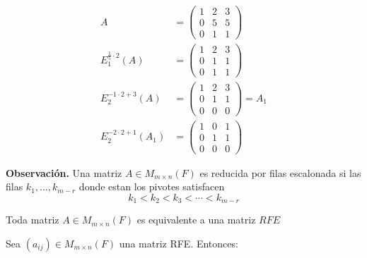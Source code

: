 \documentclass[12pt,a4paper]{book}
\begin{document}
    \begin{ejemplo}
        \begin{align*}
            A&=
            \begin{pmatrix}
                1 & 2 & 3\\
                0 & 5 & 5\\
                0 & 1 & 1
            \end{pmatrix}
            \\
            E_{1}^{\frac{1}{5}\cdot2}(A)&=
            \begin{pmatrix}
                1 & 2 & 3\\
                0 & 1 & 1\\
                0 & 1 & 1
            \end{pmatrix}
            \\
            E_{2}^{-1\cdot2+3}(A)&=
            \begin{pmatrix}
                1 & 2 & 3\\
                0 & 1 & 1\\
                0 & 0 & 0
            \end{pmatrix}
            =A_{1}
            \\
            E_{2}^{-2\cdot2+1}(A_{1})&=
            \begin{pmatrix}
                1 & 0 & 1\\
                0 & 1 & 1\\
                0 & 0 & 0
            \end{pmatrix}
        \end{align*}
    \end{ejemplo}
    \textbf{Observación.} Una matriz $A\in M_{m\times n}(F)$ es reducida por filas escalonada si las filas
    $k_{1},\dots,k_{m-r}$ donde estan los pivotes satisfacen
    \begin{equation*}
        k_{1}\lt k_{2}\lt k_{3}\lt \cdots\lt k_{m-r}
    \end{equation*}

    \begin{corolario}
        Toda matriz $A\in M_{m\times n}(F)$ es equivalente a una matriz $RFE$
    \end{corolario}

    Sea $(a_{ij}) \in M_{m \times n}(F)$ una matriz RFE. Entonces:
\end{document}
